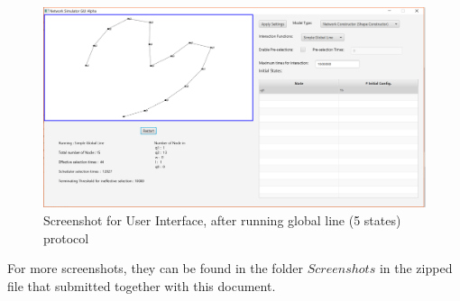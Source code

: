 \begin{figure}[H]
\begin{center}
\includegraphics[width =\textwidth]{context/diagram/GlobalLine5_NoneFastForwarding.png}
\caption{Screenshot for User Interface, after running global line (5 states) protocol}
\label{capture_star}
\end{center}
\end{figure}
\par\noindent
For more screenshots, they can be found in the folder $Screenshots$ in the zipped file that submitted together with
this document.
